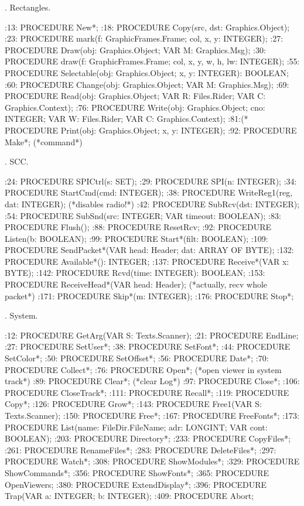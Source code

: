 . Rectangles.

:13:  PROCEDURE New*;
:18:  PROCEDURE Copy(src, dst: Graphics.Object);
:23:  PROCEDURE mark(f: GraphicFrames.Frame; col, x, y: INTEGER);
:27:  PROCEDURE Draw(obj: Graphics.Object; VAR M: Graphics.Msg);
:30:    PROCEDURE draw(f: GraphicFrames.Frame; col, x, y, w, h, lw: INTEGER);
:55:  PROCEDURE Selectable(obj: Graphics.Object; x, y: INTEGER): BOOLEAN;
:60:  PROCEDURE Change(obj: Graphics.Object; VAR M: Graphics.Msg);
:69:  PROCEDURE Read(obj: Graphics.Object; VAR R: Files.Rider; VAR C: Graphics.Context);
:76:  PROCEDURE Write(obj: Graphics.Object; cno: INTEGER; VAR W: Files.Rider; VAR C: Graphics.Context);
:81:(* PROCEDURE Print(obj: Graphics.Object; x, y: INTEGER);
:92:  PROCEDURE Make*;  (*command*)

. SCC.

:24:  PROCEDURE SPICtrl(s: SET);
:29:  PROCEDURE SPI(n: INTEGER);
:34:  PROCEDURE StartCmd(cmd: INTEGER);
:38:  PROCEDURE WriteReg1(reg, dat: INTEGER);  (*disables radio!*)
:42:  PROCEDURE SubRcv(dst: INTEGER);
:54:  PROCEDURE SubSnd(src: INTEGER; VAR timeout: BOOLEAN);
:83:  PROCEDURE Flush();
:88:  PROCEDURE ResetRcv;
:92:  PROCEDURE Listen(b: BOOLEAN);
:99:  PROCEDURE Start*(filt: BOOLEAN);
:109:  PROCEDURE SendPacket*(VAR head: Header; dat: ARRAY OF BYTE);
:132:  PROCEDURE Available*(): INTEGER;
:137:  PROCEDURE Receive*(VAR x: BYTE);
:142:  PROCEDURE Rcvd(time: INTEGER): BOOLEAN;
:153:  PROCEDURE ReceiveHead*(VAR head: Header);  (*actually, recv whole packet*)
:171:  PROCEDURE Skip*(m: INTEGER);
:176:  PROCEDURE Stop*;

. System.

:12:  PROCEDURE GetArg(VAR S: Texts.Scanner);
:21:  PROCEDURE EndLine;
:27:  PROCEDURE SetUser*;
:38:  PROCEDURE SetFont*;
:44:  PROCEDURE SetColor*;
:50:  PROCEDURE SetOffset*;
:56:  PROCEDURE Date*;
:70:  PROCEDURE Collect*;
:76:  PROCEDURE Open*;  (*open viewer in system track*)
:89:  PROCEDURE Clear*;  (*clear Log*)
:97:  PROCEDURE Close*;
:106:  PROCEDURE CloseTrack*;
:111:  PROCEDURE Recall*;
:119:  PROCEDURE Copy*;
:126:  PROCEDURE Grow*;
:143:  PROCEDURE Free1(VAR S: Texts.Scanner);
:150:  PROCEDURE Free*;
:167:  PROCEDURE FreeFonts*;
:173:  PROCEDURE List(name: FileDir.FileName; adr: LONGINT; VAR cont: BOOLEAN);
:203:  PROCEDURE Directory*;
:233:  PROCEDURE CopyFiles*;
:261:  PROCEDURE RenameFiles*;
:283:  PROCEDURE DeleteFiles*;
:297:  PROCEDURE Watch*;
:308:  PROCEDURE ShowModules*;
:329:  PROCEDURE ShowCommands*;
:356:  PROCEDURE ShowFonts*;
:365:  PROCEDURE OpenViewers;
:380:  PROCEDURE ExtendDisplay*;
:396:  PROCEDURE Trap(VAR a: INTEGER; b: INTEGER);
:409:  PROCEDURE Abort;

